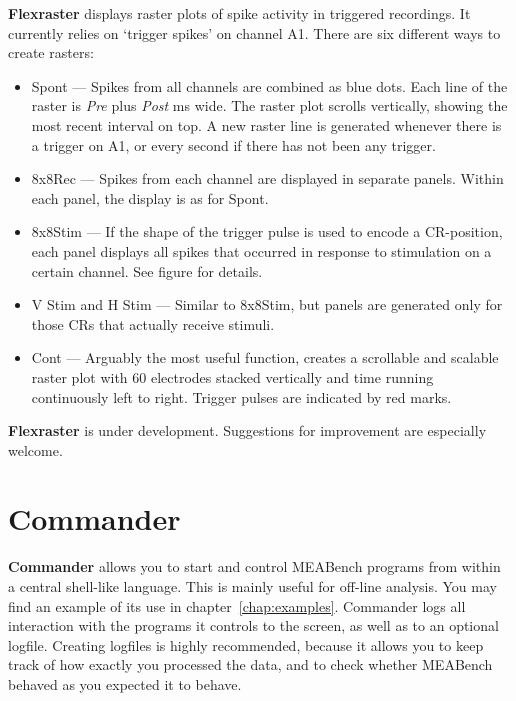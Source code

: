 \documentclass[12pt,oneside]{book}
\def\meabench{{MEABench}\xspace}
\def\prog#1{{\bf #1}}
\begin{document}
\prog{Flexraster} displays raster plots of spike activity in triggered
recordings. It currently relies on `trigger spikes' on channel A1. 
There are six different ways to create rasters:
\begin{itemize}
\item Spont --- Spikes from all channels are combined as blue dots.
Each line of the raster is \emph{Pre} plus \emph{Post} ms wide. The
raster plot scrolls vertically, showing the most recent interval on
top. A new raster line is generated whenever there is a trigger on A1,
or every second if there has not been any trigger.
\item 8x8Rec --- Spikes from each channel are displayed in separate
panels. Within each panel, the display is as for Spont.
\item 8x8Stim --- If the shape of the trigger pulse is used to encode
a CR-position, each panel displays all spikes that occurred in
response to stimulation on a certain channel. See figure for details.
\item V Stim and H Stim --- Similar to 8x8Stim, but panels are
generated only for those CRs that actually receive stimuli.
\item Cont --- Arguably the most useful function, creates a scrollable
and scalable raster plot with 60 electrodes stacked vertically and time running
continuously left to right. Trigger pulses are indicated by red marks.
\end{itemize}
\prog{Flexraster} is under development. Suggestions for
improvement are especially welcome.

\section{Commander}

\prog{Commander} allows you to start and control \meabench 
programs from within a central shell-like language. This is mainly
useful for off-line analysis. You may find an example of its use in
chapter~\ref{chap:examples}. Commander logs all interaction with the
programs it controls to the screen, as well as to an optional logfile.
Creating logfiles is highly recommended, because it allows you to keep
track of how exactly you processed the data, and to check whether
\meabench behaved as you expected it to behave.
\end{document}
